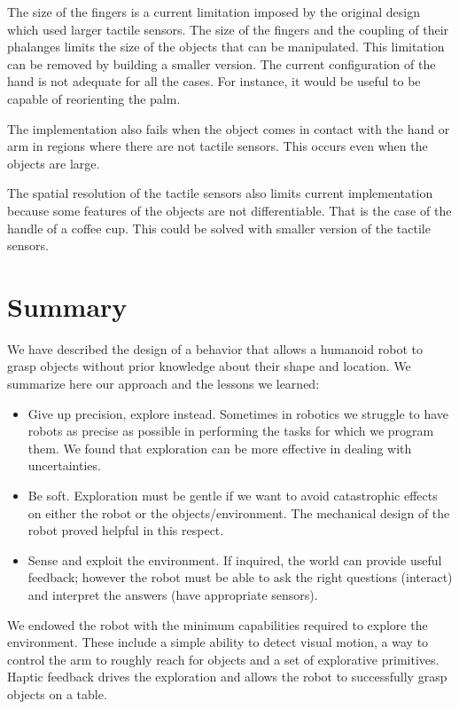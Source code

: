 The size of the fingers is a current limitation imposed by the
original design which used larger tactile sensors. The size of the
fingers and the coupling of their phalanges limits the size of the
objects that can be manipulated. This limitation can be removed by
building a smaller version. The current configuration of the hand
is not adequate for all the cases. For instance, it would be
useful to be capable of reorienting the palm.

The implementation also fails when the object comes in contact
with the hand or arm in regions where there are not tactile
sensors. This occurs even when the objects are large.

The spatial resolution of the tactile sensors also limits current
implementation because some features of the objects are not
differentiable. That is the case of the handle of a coffee cup.
This could be solved with smaller version of the tactile sensors.



\section{Summary}
\label{sec:conclusions}

We have described the design of a behavior that allows a humanoid
robot to grasp objects without prior knowledge about their shape
and location. We summarize here our approach and the lessons we
learned:
%
\begin{itemize}
%
\item Give up precision, explore instead. Sometimes in robotics we
struggle to have robots as precise as possible in performing the
tasks for which we program them. We found that exploration can be
more effective in dealing with uncertainties.
%
\item Be soft. Exploration must be gentle if we want to avoid
catastrophic effects on either the robot or the
objects/environment. The mechanical design of the robot proved
helpful in this respect.
%
\item Sense and exploit the environment. If inquired, the world
can provide useful feedback; however the robot must be able to ask
the right questions (interact) and interpret the answers (have
appropriate sensors).
%
\end{itemize}

We endowed the robot with the minimum capabilities required to
explore the environment. These include a simple ability to detect
visual motion, a way to control the arm to roughly reach for
objects and a set of explorative primitives. Haptic feedback
drives the exploration and allows the robot to successfully grasp
objects on a table.

